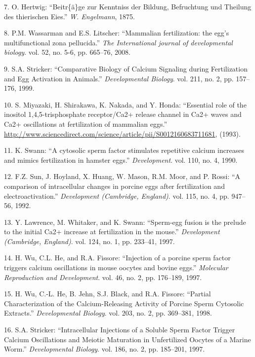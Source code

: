 \documentclass[12pt,a4paper,twoside]{ugathesis}
\theoremstyle{definition}
\theoremstyle{definition}
\theoremstyle{definition}
\theoremstyle{remark}
\begin{document}
\hypertarget{ref-hertwig1875beitrage}{}
7. O. Hertwig: ``Beitr\{ä\}ge zur Kenntniss der Bildung, Befruchtung und
Theilung des thierischen Eies.'' \emph{W. Engelmann}, 1875.

\hypertarget{ref-Wassarman2008}{}
8. P.M. Wassarman and E.S. Litscher: ``Mammalian fertilization: the
egg's multifunctional zona pellucida.'' \emph{The International journal
of developmental biology}. vol. 52, no. 5-6, pp. 665--76, 2008.

\hypertarget{ref-Stricker}{}
9. S.A. Stricker: ``Comparative Biology of Calcium Signaling during
Fertilization and Egg Activation in Animals.'' \emph{Developmental
Biology}. vol. 211, no. 2, pp. 157--176, 1999.

\hypertarget{ref-Miyazaki1993}{}
10. S. Miyazaki, H. Shirakawa, K. Nakada, and Y. Honda: ``Essential role
of the inositol 1,4,5-trisphosphate receptor/Ca2+ release channel in
Ca2+ waves and Ca2+ oscillations at fertilization of mammalian eggs.''
\url{http://www.sciencedirect.com/science/article/pii/S0012160683711681},
(1993).

\hypertarget{ref-Swann1990}{}
11. K. Swann: ``A cytosolic sperm factor stimulates repetitive calcium
increases and mimics fertilization in hamster eggs.''
\emph{Development}. vol. 110, no. 4, 1990.

\hypertarget{ref-Sun1992}{}
12. F.Z. Sun, J. Hoyland, X. Huang, W. Mason, R.M. Moor, and P. Rossi:
``A comparison of intracellular changes in porcine eggs after
fertilization and electroactivation.'' \emph{Development (Cambridge,
England)}. vol. 115, no. 4, pp. 947--56, 1992.

\hypertarget{ref-Lawrence1997}{}
13. Y. Lawrence, M. Whitaker, and K. Swann: ``Sperm-egg fusion is the
prelude to the initial Ca2+ increase at fertilization in the mouse.''
\emph{Development (Cambridge, England)}. vol. 124, no. 1, pp. 233--41,
1997.

\hypertarget{ref-Wu1997}{}
14. H. Wu, C.L. He, and R.A. Fissore: ``Injection of a porcine sperm
factor triggers calcium oscillations in mouse oocytes and bovine eggs.''
\emph{Molecular Reproduction and Development}. vol. 46, no. 2, pp.
176--189, 1997.

\hypertarget{ref-Wu1998}{}
15. H. Wu, C.-L. He, B. Jehn, S.J. Black, and R.A. Fissore: ``Partial
Characterization of the Calcium-Releasing Activity of Porcine Sperm
Cytosolic Extracts.'' \emph{Developmental Biology}. vol. 203, no. 2, pp.
369--381, 1998.

\hypertarget{ref-Stricker1997}{}
16. S.A. Stricker: ``Intracellular Injections of a Soluble Sperm Factor
Trigger Calcium Oscillations and Meiotic Maturation in Unfertilized
Oocytes of a Marine Worm.'' \emph{Developmental Biology}. vol. 186, no.
2, pp. 185--201, 1997.
\end{document}
